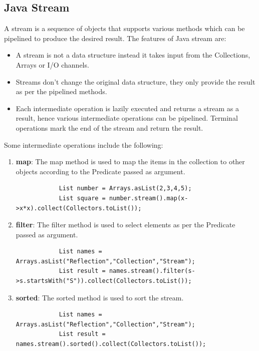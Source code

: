 \documentclass[a4paper, 11pt]{article}
\begin{document}
    \subsection{Java Stream}
        A stream is a sequence of objects that supports various methods which can be pipelined to produce the desired result.  The features of Java stream are:
        \begin{itemize}
            \item A stream is not a data structure instead it takes input from the Collections, Arrays or I/O channels.
            \item Streams don’t change the original data structure, they only provide the result as per the pipelined methods.
            \item Each intermediate operation is lazily executed and returns a stream as a result, hence various intermediate operations can be pipelined. Terminal operations mark the end of the stream and return the result.
        \end{itemize}
        Some intermediate operations include the following:
        \begin{enumerate}
            \item \textbf{map}: The map method is used to map the items in the collection to other objects according to the Predicate passed as argument.
            \begin{lstlisting}
            List number = Arrays.asList(2,3,4,5);
            List square = number.stream().map(x->x*x).collect(Collectors.toList());
            \end{lstlisting}
            \item \textbf{filter}: The filter method is used to select elements as per the Predicate passed as argument.
            \begin{lstlisting}
            List names = Arrays.asList("Reflection","Collection","Stream");
            List result = names.stream().filter(s->s.startsWith("S")).collect(Collectors.toList());
            \end{lstlisting}
            \item \textbf{sorted}: The sorted method is used to sort the stream.
            \begin{lstlisting}
            List names = Arrays.asList("Reflection","Collection","Stream");
            List result = names.stream().sorted().collect(Collectors.toList());
            \end{lstlisting}
        \end{enumerate}
\end{document}

